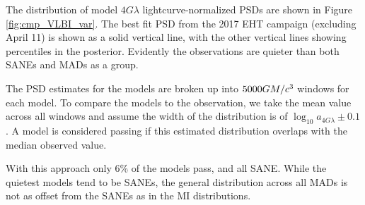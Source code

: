 \begin{figure}
{  
  }
  \label{fig:cmp_ALMA_var}
\end{figure}


The distribution of model $4G\lambda$ lightcurve-normalized PSDs are shown in Figure \ref{fig:cmp_VLBI_var}.  The best fit PSD from the 2017 EHT campaign (excluding April 11) is shown as a solid vertical line, with the other vertical lines showing percentiles in the posterior.  Evidently the observations are quieter than both SANEs and MADs as a group.

The PSD estimates for the models are broken up into $5000GM/c^3$ windows for each model. To compare the models to the observation, we take the mean value across all windows and assume the width of the distribution is of $\log_{10} a_{4G\lambda} \pm 0.1$. A model is considered passing if this estimated distribution overlaps with the median observed value.  

With this approach only 6\% of the models pass, and all SANE. While the quietest models tend to be SANEs, the general distribution across all MADs is not as offset from the SANEs as in the MI distributions. 

